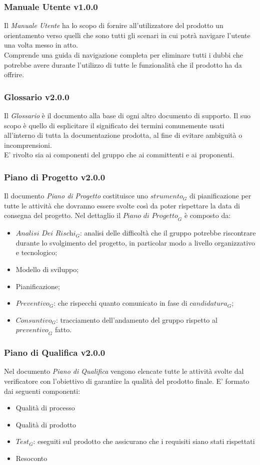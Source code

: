 \subsubsection{Manuale Utente v1.0.0}
Il \textit{Manuale Utente} ha lo scopo di fornire all'utilizzatore del prodotto un orientamento verso quelli che sono tutti gli scenari in cui potrà navigare l'utente una volta messo in atto. \\
Comprende una guida di navigazione completa per eliminare tutti i dubbi che potrebbe avere durante l'utilizzo di tutte le funzionalità che il prodotto ha da offrire.

\subsubsection{Glossario v2.0.0}
Il \textit{Glossario} è il documento alla base di ogni altro documento di supporto. Il suo scopo è quello di esplicitare il significato dei termini comunemente usati all'interno di tutta la documentazione prodotta, al fine di evitare ambiguità o incomprensioni. \\
E' rivolto sia ai componenti del gruppo che ai committenti e ai proponenti. 

\subsubsection{Piano di Progetto v2.0.0}
Il documento \textit{Piano di Progetto} costituisce uno $\textit{strumento}_G$ di pianificazione per tutte le attività che dovranno essere svolte così da poter rispettare la data di consegna del progetto.
Nel dettaglio il $\textit{Piano di Progetto}_G$ è composto da:
\begin{itemize}
    \item $\textit{Analisi Dei Rischi}_G$: analisi delle difficoltà che il gruppo potrebbe riscontrare durante lo svolgimento del progetto, in particolar modo a livello organizzativo e tecnologico;
    \item Modello di sviluppo;
    \item Pianificazione;
    \item $\textit{Preventivo}_G$: che rispecchi quanto comunicato in fase di $\textit{candidatura}_G$;
    \item $\textit{Consuntivo}_G$: tracciamento dell'andamento del gruppo rispetto al $\textit{preventivo}_G$ fatto.
\end{itemize}
\subsubsection{Piano di Qualifica v2.0.0}
Nel documento \textit{Piano di Qualifica} vengono elencate tutte le attività svolte dal verificatore con l'obiettivo di garantire la qualità del prodotto finale.
E' formato dai seguenti componenti:
\begin{itemize}
    \item Qualità di processo
    \item Qualità di prodotto
    \item $\textit{Test}_G$: eseguiti sul prodotto che assicurano che i requisiti siano stati rispettati
    \item Resoconto
\end{itemize}
